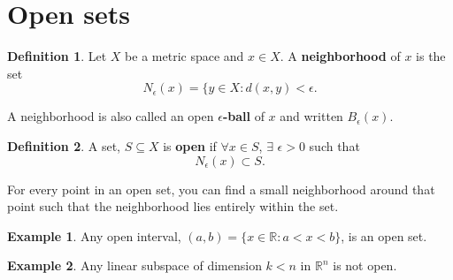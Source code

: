 \documentclass[12pt,reqno]{amsart}
\theoremstyle{definition}
\newtheorem{definition}{Definition}[section]
\newtheorem{example}{Example}[section]
\def\R{\mathbb{R}}
\begin{document}
\section{Open sets}

\begin{definition}
  Let $X$ be a metric space and $x \in X$. A \textbf{neighborhood} of
  $x$ is the set 
  \[ N_\epsilon (x) = \{y \in X: d(x,y) < \epsilon. \]
\end{definition}
A neighborhood is also called an open $\epsilon$\textbf{-ball} of $x$
and written $B_{\epsilon}(x)$. 
\begin{definition}
  A set, $S \subseteq X$ is \textbf{open} if $\forall x \in S$,
  $\exists$ $\epsilon>0$ such that 
  \[ N_\epsilon(x) \subset S. \]
\end{definition}
For every point in an open set, you can find a small neighborhood
around that point such that the neighborhood lies entirely within the
set. 
\begin{example}
  Any open interval, $(a,b) = \{x \in \R: a<x<b\}$, is an open set. 
\end{example}
\begin{example}
  Any linear subspace of dimension $k < n$ in $\R^n$ is not open. 
\end{example}
\end{document}

